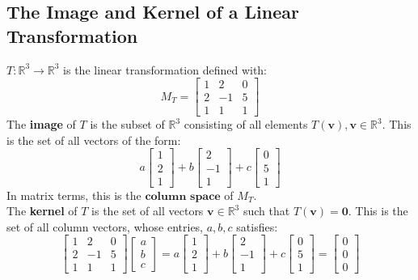 \documentclass[a4paper, 9pt]{extarticle}
\begin{document}
\subsection{The Image and Kernel of a Linear Transformation}
$T:\mathbb{R}^3 \to \mathbb{R}^3$ is the linear transformation defined with:
$$
  M_T = \begin{bmatrix}
    1 & 2  & 0 \\
    2 & -1 & 5 \\
    1 & 1  & 1
  \end{bmatrix}
$$
The \textbf{image} of $T$ is the subset of $\mathbb{R}^3$ consisting of all elements $T(\mathbf{v}), \mathbf{v} \in \mathbb{R}^3$. This is the set of all vectors of the form:
$$
  a \begin{bmatrix}
    1 \\
    2 \\
    1
  \end{bmatrix}
  +
  b \begin{bmatrix}
    2  \\
    -1 \\
    1
  \end{bmatrix}
  +
  c \begin{bmatrix}
    0 \\
    5 \\
    1
  \end{bmatrix}
$$
In matrix terms, this is the $\textbf{column space}$ of $M_T$. \\
The \textbf{kernel} of $T$ is the set of all vectors $\mathbf{v} \in \mathbb{R}^3$ such that $T(\mathbf{v}) = \mathbf{0}$. This is the set of all column vectors, whose entries, $a,b,c$ satisfies:
$$
  \begin{bmatrix}
    1 & 2  & 0 \\
    2 & -1 & 5 \\
    1 & 1  & 1
  \end{bmatrix}
  \begin{bmatrix}
    a \\
    b \\
    c
  \end{bmatrix}
  =
  a \begin{bmatrix}
    1 \\
    2 \\
    1
  \end{bmatrix}
  +
  b \begin{bmatrix}
    2  \\
    -1 \\
    1
  \end{bmatrix}
  +
  c \begin{bmatrix}
    0 \\
    5 \\
    1
  \end{bmatrix}
  =
  \begin{bmatrix}
    0 \\
    0 \\
    0
  \end{bmatrix}
$$
\end{document}
